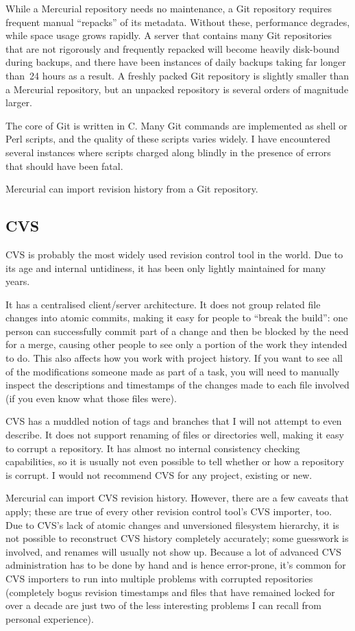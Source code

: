 While a Mercurial repository needs no maintenance, a Git repository
requires frequent manual ``repacks'' of its metadata.  Without these,
performance degrades, while space usage grows rapidly.  A server that
contains many Git repositories that are not rigorously and frequently
repacked will become heavily disk-bound during backups, and there have
been instances of daily backups taking far longer than~24 hours as a
result.  A freshly packed Git repository is slightly smaller than a
Mercurial repository, but an unpacked repository is several orders of
magnitude larger.

The core of Git is written in C.  Many Git commands are implemented as
shell or Perl scripts, and the quality of these scripts varies widely.
I have encountered several instances where scripts charged along
blindly in the presence of errors that should have been fatal.

Mercurial can import revision history from a Git repository.


\subsection{CVS}

CVS is probably the most widely used revision control tool in the
world.  Due to its age and internal untidiness, it has been only
lightly maintained for many years.

It has a centralised client/server architecture.  It does not group
related file changes into atomic commits, making it easy for people to
``break the build'': one person can successfully commit part of a
change and then be blocked by the need for a merge, causing other
people to see only a portion of the work they intended to do.  This
also affects how you work with project history.  If you want to see
all of the modifications someone made as part of a task, you will need
to manually inspect the descriptions and timestamps of the changes
made to each file involved (if you even know what those files were).

CVS has a muddled notion of tags and branches that I will not attempt
to even describe.  It does not support renaming of files or
directories well, making it easy to corrupt a repository.  It has
almost no internal consistency checking capabilities, so it is usually
not even possible to tell whether or how a repository is corrupt.  I
would not recommend CVS for any project, existing or new.

Mercurial can import CVS revision history.  However, there are a few
caveats that apply; these are true of every other revision control
tool's CVS importer, too.  Due to CVS's lack of atomic changes and
unversioned filesystem hierarchy, it is not possible to reconstruct
CVS history completely accurately; some guesswork is involved, and
renames will usually not show up.  Because a lot of advanced CVS
administration has to be done by hand and is hence error-prone, it's
common for CVS importers to run into multiple problems with corrupted
repositories (completely bogus revision timestamps and files that have
remained locked for over a decade are just two of the less interesting
problems I can recall from personal experience).

